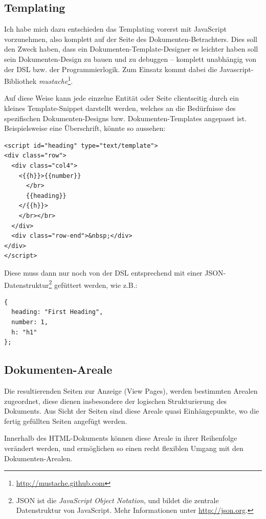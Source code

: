 \subsection{Templating}\label{sec-templating}

Ich habe mich dazu entschieden das Templating vorerst mit JavaScript
vorzunehmen, also komplett auf der Seite des Dokumenten-Betrachters.
Dies soll den Zweck haben, dass ein Dokumenten-Template-Designer es
leichter haben soll sein Dokumenten-Design zu bauen und zu debuggen --
komplett unabhängig von der DSL bzw. der Programmierlogik.
Zum Einsatz kommt dabei die Javascript-Bib\-lio\-thek
\emph{mustache}\footnote{\url{http://mustache.github.com}}.

Auf diese Weise kann jede einzelne Entität oder Seite clientseitig
durch ein kleines Template-Snippet darstellt werden, welches an die
Bedürfnisse des spezifischen Dokumenten-Designs bzw. Dokumenten-Templates
angepasst ist. Beispielsweise eine Überschrift, könnte so aussehen:

\begin{verbatim}
<script id="heading" type="text/template">
<div class="row">
  <div class="col4">
    <{{h}}>{{number}}
      </br>
      {{heading}}
    </{{h}}>
    </br></br>
  </div>
  <div class="row-end">&nbsp;</div>
</div>
</script>
\end{verbatim}

Diese muss dann nur noch von der DSL entsprechend mit einer
JSON-Daten\-struktur\footnote{JSON ist die \emph{JavaScript Object Notation},
und bildet die zentrale Datenstruktur von JavaScript.
Mehr Informationen unter \url{http://json.org}.} gefüttert werden, wie z.B.:

\begin{verbatim}
{
  heading: "First Heading",
  number: 1,
  h: "h1"
};
\end{verbatim}

\subsection{Dokumenten-Areale}\label{sec-areal}

Die resultierenden Seiten zur Anzeige (View Pages), werden bestimmten
Arealen zugeordnet, diese dienen insbesondere der logischen Strukturierung
des Dokuments. Aus Sicht der Seiten sind diese Areale quasi
Einhängepunkte, wo die fertig gefüllten Seiten angefügt werden.

Innerhalb des HTML-Dokuments können diese Areale in ihrer Reihenfolge
verändert werden, und ermöglichen so einen recht flexiblen Umgang mit
den Doku\-men\-ten-Arealen.


